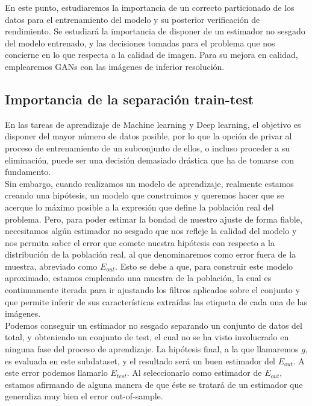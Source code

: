 En este punto, estudiaremos la importancia de un correcto particionado de los datos para el entrenamiento del modelo y su posterior verificación de rendimiento. Se estudiará la importancia de disponer de un estimador no sesgado del modelo entrenado, y las decisiones tomadas para el problema que nos concierne en lo que respecta a la calidad de imagen. Para su mejora en calidad, emplearemos GANs con las imágenes de inferior resolución.

\subsection{Importancia de la separación train-test}
En las tareas de aprendizaje de Machine learning y Deep learning, el objetivo es disponer del mayor número de datos posible, por lo que la opción de privar al proceso de entrenamiento de un subconjunto de ellos, o incluso proceder a su eliminación, puede ser una decisión demasiado drástica que ha de tomarse con fundamento.\\

Sin embargo, cuando realizamos un modelo de aprendizaje, realmente estamos creando una hipótesis, un modelo que construimos y queremos hacer que se acerque lo máximo posible a la expresión que define la población real del problema. Pero, para poder estimar la bondad de nuestro ajuste de forma fiable, necesitamos algún estimador no sesgado que nos refleje la calidad del modelo y nos permita saber el error que comete nuestra hipótesis con respecto a la distribución de la población real, al que denominaremos como error fuera de la muestra, abreviado como $E_{out}$.  Esto se debe a que, para construir este modelo aproximado, estamos empleando una muestra de la población, la cual es continuamente iterada para ir ajustando los filtros aplicados sobre el conjunto y que permite inferir de sus características extraídas las etiqueta de cada una de las imágenes.\\

Podemos conseguir un estimador no sesgado separando un conjunto de datos del total, y obteniendo un conjunto de test, el cual no se ha visto involucrado en ninguna fase del proceso de aprendizaje. La hipótesis final, a la que llamaremos $g$, es evaluada en este subdataset, y el resultado será un buen estimador del $E_{out}$. A este error podemos llamarlo $E_{test}$. Al seleccionarlo como estimador de $E_{out}$, estamos afirmando de alguna manera de que éste se tratará de un estimador que generaliza muy bien el error out-of-sample.\\

